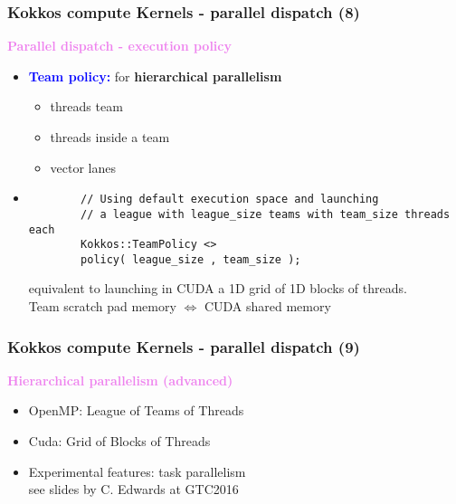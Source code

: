 \begin{frame}[fragile=singleslide]
  \frametitle{Kokkos compute Kernels - parallel dispatch (8)}
  
  {\Large \textcolor{violet}{\textbf{Parallel dispatch - execution policy}}}

  \begin{itemize}
  \item \textcolor{blue}{\bf Team policy:} for {\bf hierarchical parallelism}
    \begin{itemize}
    \item threads team %
    \item threads inside a team %
    \item vector lanes
    \end{itemize}
  \item 
    {\small
      \begin{verbatim}
        // Using default execution space and launching
        // a league with league_size teams with team_size threads each
        Kokkos::TeamPolicy <>
        policy( league_size , team_size );
      \end{verbatim}
    }
    equivalent to launching in CUDA a 1D grid of 1D blocks of threads.\\
    Team scratch pad memory $\Longleftrightarrow$ CUDA shared memory
  \end{itemize}
\end{frame}
  
\begin{frame}[fragile=singleslide]
  \frametitle{Kokkos compute Kernels - parallel dispatch (9)}
  
  {\Large \textcolor{violet}{\textbf{Hierarchical parallelism (advanced)}}}

  \begin{itemize}
  \item OpenMP: League of Teams of Threads
  \item Cuda: Grid of Blocks of Threads
  \item Experimental features: task parallelism\\
    {\small see slides by C. Edwards at GTC2016 }
  \end{itemize}
  
\end{frame}
